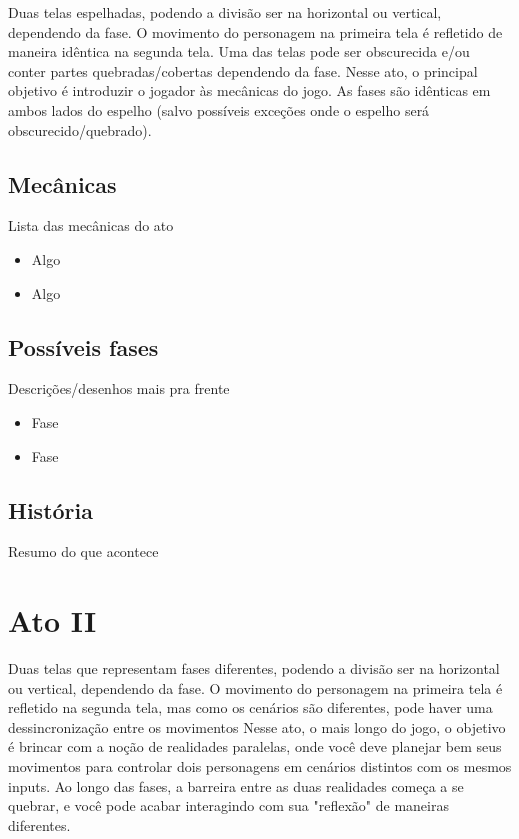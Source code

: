 \documentclass[a4paper, 11pt]{article}
\begin{document}
	Duas telas espelhadas, podendo a divisão ser na horizontal ou vertical, dependendo da fase. O movimento do
	personagem na primeira tela é refletido de maneira idêntica na segunda tela. Uma das telas pode ser obscurecida
	e/ou conter partes quebradas/cobertas dependendo da fase.
	Nesse ato, o principal objetivo é introduzir o jogador às mecânicas do jogo. As fases são idênticas
	em ambos lados do espelho (salvo possíveis exceções onde o espelho será obscurecido/quebrado).

\subsection{Mecânicas}

	Lista das mecânicas do ato
	\begin{itemize}
		\item Algo
		\item Algo
	\end{itemize}

\subsection{Possíveis fases}

	Descrições/desenhos mais pra frente
	\begin{itemize}
		\item Fase
		\item Fase
	\end{itemize}

\subsection{História}

	Resumo do que acontece 

\section{Ato II}

	Duas telas que representam fases diferentes, podendo a divisão ser na horizontal ou vertical, dependendo da fase.
	O movimento do personagem na primeira tela é refletido na segunda tela, mas como os cenários são diferentes, pode
	haver uma dessincronização entre os movimentos
	Nesse ato, o mais longo do jogo, o objetivo é brincar com a noção de realidades paralelas, onde você deve planejar
	bem seus movimentos para controlar dois personagens em cenários distintos com os mesmos inputs. Ao longo das fases,
	a barreira entre as duas realidades começa a se quebrar, e você pode acabar interagindo com sua "reflexão" de 
	maneiras diferentes.
\end{document}
